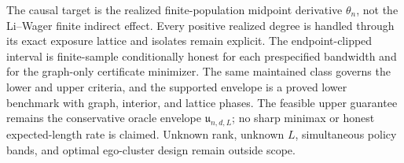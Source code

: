 The causal target is the realized finite-population midpoint derivative \(\theta_n\), not the Li--Wager finite indirect effect.  Every positive realized degree is handled through its exact exposure lattice and isolates remain explicit.  The endpoint-clipped interval is finite-sample conditionally honest for each prespecified bandwidth and for the graph-only certificate minimizer.  The same maintained class governs the lower and upper criteria, and the supported envelope is a proved lower benchmark with graph, interior, and lattice phases.  The feasible upper guarantee remains the conservative oracle envelope \(\mathfrak u_{n,d,L}\); no sharp minimax or honest expected-length rate is claimed.  Unknown rank, unknown \(L\), simultaneous policy bands, and optimal ego-cluster design remain outside scope.